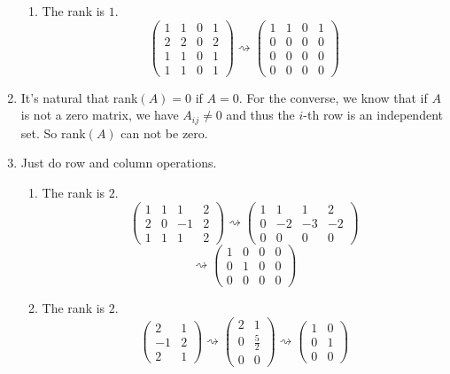 \begin{enumerate}
\begin{enumerate}
\item The rank is $1$.
\[\left(\begin{array}{cccc}1&1&0&1\\2&2&0&2\\1&1&0&1\\1&1&0&1 \end{array}\right)\rightsquigarrow \left(\begin{array}{cccc}1&1&0&1\\0&0&0&0\\0&0&0&0\\0&0&0&0 \end{array}\right)\]
\end{enumerate}
\item It's natural that rank$(A)=0$ if $A=0$. For the converse, we know that if $A$ is not a zero matrix, we have $A_{ij}\neq 0$ and thus the $i$-th row is an independent set. So rank$(A)$ can not be zero.
\item Just do row and column operations. \begin{enumerate}
\item The rank is $2$.
\[\left(\begin{array}{cccc}1&1&1&2\\2&0&-1&2\\1&1&1&2\end{array}\right)\rightsquigarrow \left(\begin{array}{cccc}1&1&1&2\\0&-2&-3&-2\\0&0&0&0\end{array}\right)\]
\[\rightsquigarrow \left(\begin{array}{cccc}1&0&0&0\\0&1&0&0\\0&0&0&0\end{array}\right)\]
\item The rank is $2$.
\[\left(\begin{array}{cc}2&1\\-1&2\\2&1\end{array}\right)\rightsquigarrow \left(\begin{array}{cc}2&1\\0&\frac{5}{2}\\0&0\end{array}\right)\rightsquigarrow \left(\begin{array}{cc}1&0\\0&1\\0&0\end{array}\right)\]

\end{enumerate}
\end{enumerate}
